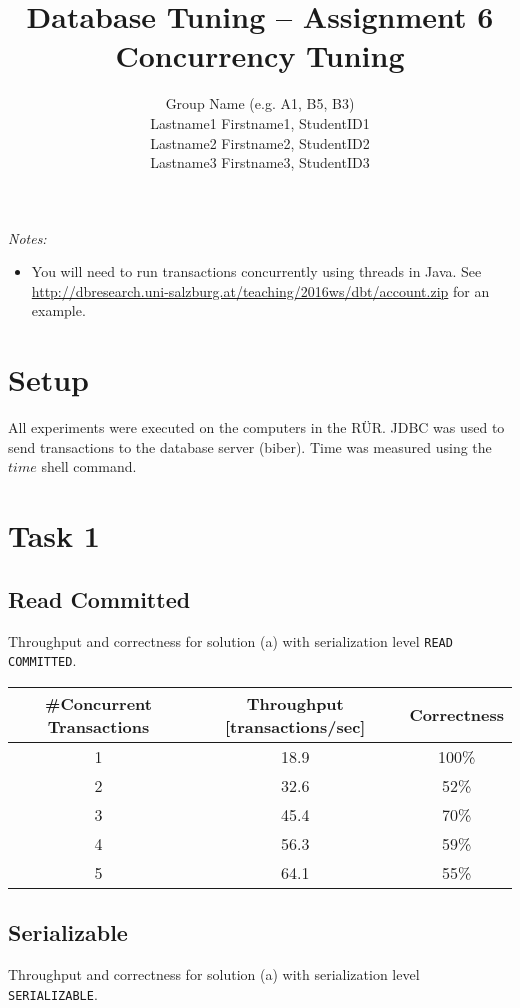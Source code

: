 \documentclass[11pt]{scrartcl}
\title{
  \textbf{\large Database Tuning -- Assignment 6}\\
  Concurrency Tuning
}
\author{
 Group Name (e.g. A1, B5, B3)\\
 \large Lastname1 Firstname1, StudentID1 \\
 \large Lastname2 Firstname2, StudentID2 \\
 \large Lastname3 Firstname3, StudentID3 
}
\begin{document}
\maketitle

\noindent
{\it Notes:}

\begin{itemize}
\item You will need to run transactions concurrently using threads in
  Java. See\\ \url{http://dbresearch.uni-salzburg.at/teaching/2016ws/dbt/account.zip}
  for an example.
\end{itemize}

\section*{Setup}
All experiments were executed on the computers in the R\"UR. JDBC was used to send
transactions to the database server (biber). Time was measured using the $time$ shell command.

\section*{Task 1}

\subsection*{Read Committed}

Throughput and correctness for solution (a) with serialization level
{\tt\small READ COMMITTED}.

\bigskip

\begin{tabular}{c|c|c}
  \#Concurrent Transactions & Throughput [transactions/sec] & Correctness
  \\\hline
  1 & 18.9 & 100\% \\
  2 & 32.6 & 52\% \\
  3 & 45.4 & 70\% \\
  4 & 56.3 & 59\% \\
  5 & 64.1 & 55\% \\    
\end{tabular}

\medskip

\subsection*{Serializable}

Throughput and correctness for solution (a) with serialization level
{\tt\small SERIALIZABLE}.
\end{document}
